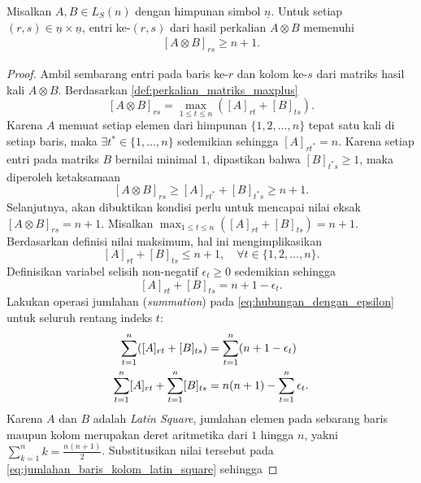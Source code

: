 \begin{proposisi}\label{prop:batas_bawah_perkalian_latin_square}
  Misalkan $A,B\in L_S(n)$ dengan himpunan simbol $\underline{n}$. Untuk setiap $(r,s)\in \underline{n}\times \underline{n}$, entri ke-$(r,s)$ dari hasil perkalian $A\otimes B$ memenuhi
  \begin{align}\label{eq:batas_bawah_entri_perkalian_latin_square}
    [A\otimes B]_{rs}\ge n+1.
  \end{align}
\end{proposisi}
\begin{proof}
  Ambil sembarang entri pada baris ke-$r$ dan kolom ke-$s$ dari matriks hasil kali $A \otimes B$. Berdasarkan \autoref{def:perkalian_matriks_maxplus}
  \[
    [A \otimes B]_{rs} = \max_{1 \le t \le n} ([A]_{rt} + [B]_{ts}).
  \]
  Karena $A$ memuat setiap elemen dari himpunan $\{1, 2, \ldots, n\}$ tepat satu kali di setiap baris, maka $\exists t^* \in \{1, \ldots, n\}$ sedemikian sehingga $[A]_{rt^*} = n$. Karena setiap entri pada matriks $B$ bernilai minimal $1$, dipastikan bahwa $[B]_{t^*s} \ge 1$, maka diperoleh ketaksamaan
  \[
    [A \otimes B]_{rs} \ge [A]_{rt^*} + [B]_{t^*s} \ge n + 1.
  \]
  Selanjutnya, akan dibuktikan kondisi perlu untuk mencapai nilai eksak $[A \otimes B]_{rs} = n+1$. Misalkan $\displaystyle\max_{1 \le t \le n} ([A]_{rt} + [B]_{ts}) = n+1$. Berdasarkan definisi nilai maksimum, hal ini mengimplikasikan
  \[
    [A]_{rt} + [B]_{ts} \le n+1, \quad \forall t \in \{1, 2, \ldots, n\}.
  \]
  Definisikan variabel selisih non-negatif $\epsilon_t \ge 0$ sedemikian sehingga
  \begin{equation}\label{eq:hubungan_dengan_epsilon}
    [A]_{rt} + [B]_{ts} = n+1 - \epsilon_t.
  \end{equation}
  Lakukan operasi jumlahan (\emph{summation}) pada \eqref{eq:hubungan_dengan_epsilon} untuk seluruh rentang indeks $t$:
  \begin{align}
    \sum_{t=1}^n ([A]_{rt} + [B]_{ts})            & = \sum_{t=1}^n (n+1 - \epsilon_t) \notag                                         \\
    \sum_{t=1}^n [A]_{rt} + \sum_{t=1}^n [B]_{ts} & = n(n+1) - \sum_{t=1}^n \epsilon_t. \label{eq:jumlahan_baris_kolom_latin_square}
  \end{align}
  Karena $A$ dan $B$ adalah \emph{Latin Square}, jumlahan elemen pada sebarang baris maupun kolom merupakan deret aritmetika dari $1$ hingga $n$, yakni $\sum_{k=1}^n k = \frac{n(n+1)}{2}$. Substitusikan nilai tersebut pada \eqref{eq:jumlahan_baris_kolom_latin_square} sehingga

\end{proof}
